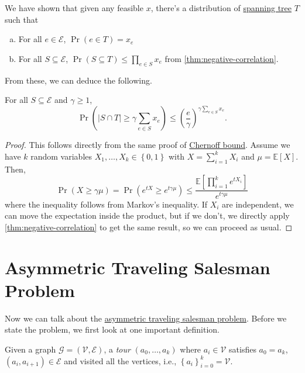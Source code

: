 \begin{prev}
	We have shown that given any feasible \(x\), there's a distribution of \hyperref[def:spanning-tree]{spanning tree} \(T\) such that
	\begin{enumerate}[(a)]
		\item For all \(e\in \mathcal{E} \), \(\Pr(e\in T) = x_e\)
		\item For all \(S \subseteq \mathcal{E} \), \(\Pr(S \subseteq T) \leq \prod_{e\in S} x_e\) from \autoref{thm:negative-correlation}.
	\end{enumerate}
\end{prev}

From these, we can deduce the following.
\begin{theorem}\label{thm:lec11}
	For all \(S \subseteq \mathcal{E} \) and \(\gamma \geq 1\),
	\[
		\Pr(\left\vert S \cap T \right\vert \geq \gamma \sum_{e\in S} x_e) \leq \left( \frac{e}{\gamma } \right) ^{\gamma \sum_{e\in S} x_e}.
	\]
\end{theorem}
\begin{proof}
	This follows directly from the same proof of \href{https://en.wikipedia.org/wiki/Chernoff_bound}{Chernoff bound}. Assume we have \(k\) random variables \(X_1, \dots, X_k \in \left\{ 0, 1 \right\} \) with \(X = \sum_{i=1} ^k X_i\) and \(\mu = \mathbb{E}\left[X \right]\). Then,
	\[
		\Pr(X \geq \gamma \mu )= \Pr(e^{tX} \geq e^{t \gamma \mu }) \leq \frac{\mathbb{E}\left[\prod_{i=1}^{k} e^{tX_i} \right] }{e^{t \gamma \mu }}
	\]
	where the inequality follows from Markov's inequality. If \(X_i\) are independent, we can move the expectation inside the product, but if we don't, we directly apply \autoref{thm:negative-correlation} to get the same result, so we can proceed as usual.
\end{proof}

\section{Asymmetric Traveling Salesman Problem}

Now we can talk about the \hyperref[prb:ATSP]{asymmetric traveling salesman problem}. Before we state the problem, we first look at one important definition.

\begin{definition}[Tour]\label{def:tour}
	Given a graph \(\mathcal{G} =(\mathcal{V} , \mathcal{E} )\), a \emph{tour} \((a_0, \dots , a_k)\) where \(a_i\in \mathcal{V} \) satisfies \(a_0 = a_k\), \((a_i, a_{i+1})\in \mathcal{E} \) and visited all the vertices, i.e., \(\left\{ a_i \right\} _{i=0}^k = \mathcal{V} \).
\end{definition}


